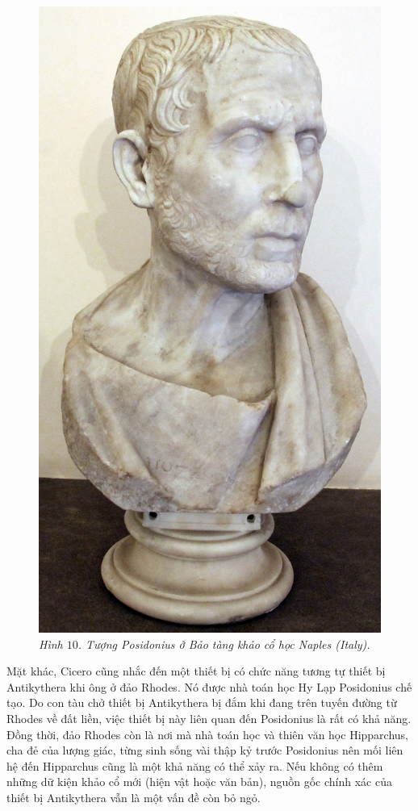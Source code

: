\begin{multicols}{2}
\begin{figure}
		\centering
		\captionsetup{labelformat= empty, justification=centering}
		\includegraphics[width= 1\linewidth]{11}
		\caption{\small\textit{\color{lichsutoanhoc}Hình $10$. Tượng Posidonius ở Bảo tàng khảo cổ học Naples (Italy).}}
		\vspace*{-10pt}
	\end{figure}
	Mặt khác, Cicero cũng nhắc đến một thiết bị có chức năng tương tự thiết bị Antikythera khi ông ở đảo Rhodes. Nó được nhà toán học Hy Lạp Posidonius chế tạo. Do con tàu chở thiết bị Antikythera bị đắm khi đang trên tuyến đường từ Rhodes về đất liền, việc thiết bị này liên quan đến Posidonius là rất có khả năng. Đồng thời, đảo Rhodes còn là nơi mà nhà toán học và thiên văn học Hipparchus, cha đẻ của lượng giác, từng sinh sống vài thập kỷ trước Posidonius nên mối liên hệ đến Hipparchus cũng là một khả năng có thể xảy ra. Nếu không có thêm những dữ kiện khảo cổ mới (hiện vật hoặc văn bản), nguồn gốc chính xác của thiết bị Antikythera vẫn là một vấn đề còn bỏ ngỏ.

\end{multicols}
